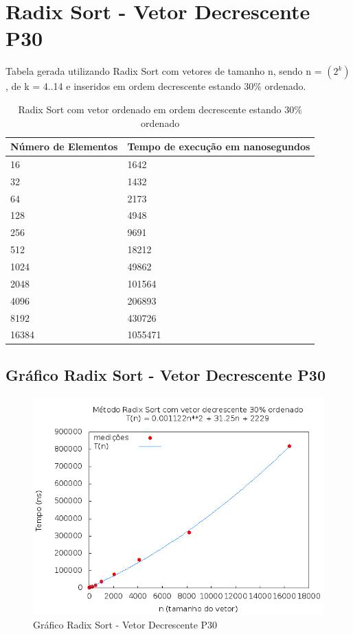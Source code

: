 \documentclass[12pt,a4paper,twoside]{report}
\begin{document}
\section{Radix Sort - Vetor Decrescente P30}
Tabela gerada utilizando Radix Sort com vetores de tamanho n, sendo n = $(2^k)$, de k = 4..14 e inseridos em ordem decrescente estando 30\% ordenado.
\begin{table}[H]
\centering
\caption{Radix Sort com vetor ordenado em ordem decrescente estando 30\% ordenado}
\label{my-label}
\begin{tabular}{|l|l|}
\hline
\multicolumn{1}{|c|}{\textbf{Número de Elementos}} & \multicolumn{1}{c|}{\textbf{Tempo de execução em nanosegundos}} \\ \hline
16 & 1642 \\ \hline
32 & 1432 \\ \hline
64 & 2173 \\ \hline
128 & 4948 \\ \hline
256 & 9691 \\ \hline
512 & 18212 \\ \hline
1024 & 49862 \\ \hline
2048 & 101564 \\ \hline
4096 & 206893 \\ \hline
8192 & 430726 \\ \hline
16384 & 1055471 \\ \hline
\end{tabular}
\end{table}

\subsection{Gráfico Radix Sort - Vetor Decrescente P30}
\begin{figure}[H]
    \centering
    \includegraphics[width=0.7\linewidth]{graficos/RadixSort/vIntDecrescenteP30/vIntDecrescenteP30.png}
  \caption{Gráfico Radix Sort - Vetor Decrescente P30}
\end{figure}
\end{document}
